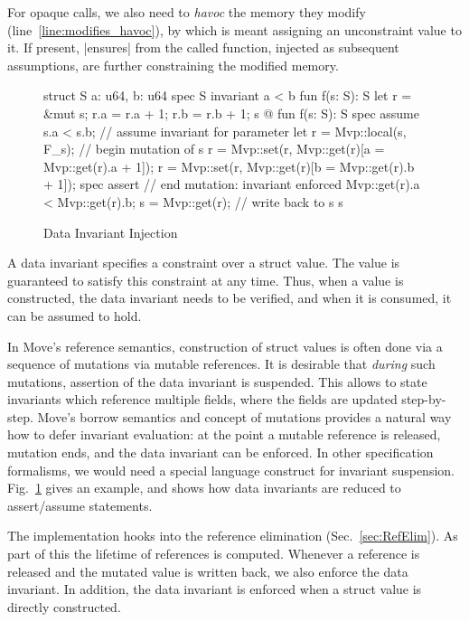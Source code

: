 For opaque calls, we also need to \emph{havoc} the memory they modify
(line~\ref{line:modifies_havoc}), by which is meant assigning an unconstraint
value to it. If present, |ensures| from the called function, injected as
subsequent assumptions, are further constraining the modified memory.



\begin{figure}[t!]
  \caption{Data Invariant Injection}
  \label{fig:DataInvariants}
  \centering
\begin{MoveBox}
  struct S { a: u64, b: u64 }
  spec S { invariant a < b }
  fun f(s: S): S { let r = &mut s; r.a = r.a + 1; r.b = r.b + 1; s }
  @\transform@
  fun f(s: S): S {
    spec assume s.a < s.b;      // assume invariant for parameter
    let r = Mvp::local(s, F_s); // begin mutation of s
    r = Mvp::set(r, Mvp::get(r)[a = Mvp::get(r).a + 1]);
    r = Mvp::set(r, Mvp::get(r)[b = Mvp::get(r).b + 1]);
    spec assert                 // end mutation: invariant enforced
      Mvp::get(r).a < Mvp::get(r).b;
    s = Mvp::get(r);            // write back to s
    s
  }
\end{MoveBox}
\end{figure}

A data invariant specifies a constraint over a struct value. The value is
guaranteed to satisfy this constraint at any time. Thus, when a value is
constructed, the data invariant needs to be verified, and when it is consumed,
it can be assumed to hold.

In Move's reference semantics, construction of struct values is often done via a
sequence of mutations via mutable references. It is desirable that \emph{during}
such mutations, assertion of the data invariant is suspended. This allows to
state invariants which reference multiple fields, where the fields are updated
step-by-step.  Move's borrow semantics and concept of mutations provides a
natural way how to defer invariant evaluation: at the point a mutable reference
is released, mutation ends, and the data invariant can be enforced.  In other
specification formalisms, we would need a special language construct for
invariant suspension. Fig.~\ref{fig:DataInvariants} gives an example, and shows
how data invariants are reduced to assert/assume statements.


The implementation hooks into the reference elimination
(Sec.~\ref{sec:RefElim}). As part of this the lifetime of references is
computed. Whenever a reference is released and the mutated value is written
back, we also enforce the data invariant. In addition, the data invariant is
enforced when a struct value is directly constructed.




